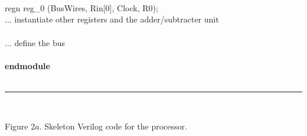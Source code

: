 \documentclass[epsfig,10pt,fullpage]{article}
\begin{document}
\begin{center}
\begin{minipage}[t]{12.5 cm}
\begin{tabbing}
\>\\
\\
~\\
\>regn reg\_0 (BusWires, Rin[0], Clock, R0);\\
\>$\ldots$ instantiate other registers and the adder/subtracter unit\\
~\\
\>$\ldots$ define the bus\\
~\\
{\bf endmodule}\\
~\rule{5.0in}{0in}\\
\end{tabbing}
\end{minipage}
\end{center}

\begin{center}
Figure 2$a$. Skeleton Verilog code for the processor.
\end{center}
\end{document}
